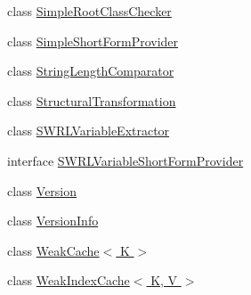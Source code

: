 \begin{DoxyCompactItemize}
\item 
class \hyperlink{classorg_1_1semanticweb_1_1owlapi_1_1util_1_1_simple_root_class_checker}{Simple\-Root\-Class\-Checker}
\item 
class \hyperlink{classorg_1_1semanticweb_1_1owlapi_1_1util_1_1_simple_short_form_provider}{Simple\-Short\-Form\-Provider}
\item 
class \hyperlink{classorg_1_1semanticweb_1_1owlapi_1_1util_1_1_string_length_comparator}{String\-Length\-Comparator}
\item 
class \hyperlink{classorg_1_1semanticweb_1_1owlapi_1_1util_1_1_structural_transformation}{Structural\-Transformation}
\item 
class \hyperlink{classorg_1_1semanticweb_1_1owlapi_1_1util_1_1_s_w_r_l_variable_extractor}{S\-W\-R\-L\-Variable\-Extractor}
\item 
interface \hyperlink{interfaceorg_1_1semanticweb_1_1owlapi_1_1util_1_1_s_w_r_l_variable_short_form_provider}{S\-W\-R\-L\-Variable\-Short\-Form\-Provider}
\item 
class \hyperlink{classorg_1_1semanticweb_1_1owlapi_1_1util_1_1_version}{Version}
\item 
class \hyperlink{classorg_1_1semanticweb_1_1owlapi_1_1util_1_1_version_info}{Version\-Info}
\item 
class \hyperlink{classorg_1_1semanticweb_1_1owlapi_1_1util_1_1_weak_cache_3_01_k_01_4}{Weak\-Cache$<$ K $>$}
\item 
class \hyperlink{classorg_1_1semanticweb_1_1owlapi_1_1util_1_1_weak_index_cache_3_01_k_00_01_v_01_4}{Weak\-Index\-Cache$<$ K, V $>$}
\end{DoxyCompactItemize}
